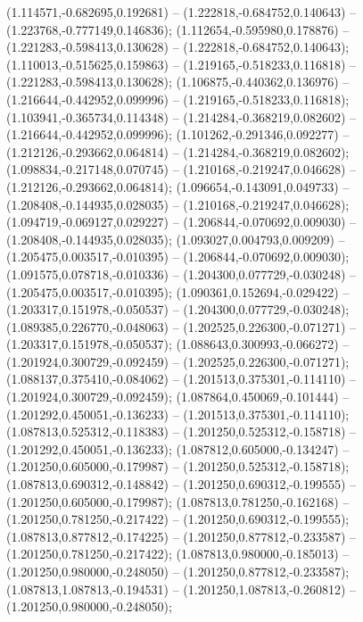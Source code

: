  (1.114571,-0.682695,0.192681) -- (1.222818,-0.684752,0.140643) -- (1.223768,-0.777149,0.146836);
 (1.112654,-0.595980,0.178876) -- (1.221283,-0.598413,0.130628) -- (1.222818,-0.684752,0.140643);
 (1.110013,-0.515625,0.159863) -- (1.219165,-0.518233,0.116818) -- (1.221283,-0.598413,0.130628);
 (1.106875,-0.440362,0.136976) -- (1.216644,-0.442952,0.099996) -- (1.219165,-0.518233,0.116818);
 (1.103941,-0.365734,0.114348) -- (1.214284,-0.368219,0.082602) -- (1.216644,-0.442952,0.099996);
 (1.101262,-0.291346,0.092277) -- (1.212126,-0.293662,0.064814) -- (1.214284,-0.368219,0.082602);
 (1.098834,-0.217148,0.070745) -- (1.210168,-0.219247,0.046628) -- (1.212126,-0.293662,0.064814);
 (1.096654,-0.143091,0.049733) -- (1.208408,-0.144935,0.028035) -- (1.210168,-0.219247,0.046628);
 (1.094719,-0.069127,0.029227) -- (1.206844,-0.070692,0.009030) -- (1.208408,-0.144935,0.028035);
 (1.093027,0.004793,0.009209) -- (1.205475,0.003517,-0.010395) -- (1.206844,-0.070692,0.009030);
 (1.091575,0.078718,-0.010336) -- (1.204300,0.077729,-0.030248) -- (1.205475,0.003517,-0.010395);
 (1.090361,0.152694,-0.029422) -- (1.203317,0.151978,-0.050537) -- (1.204300,0.077729,-0.030248);
 (1.089385,0.226770,-0.048063) -- (1.202525,0.226300,-0.071271) -- (1.203317,0.151978,-0.050537);
 (1.088643,0.300993,-0.066272) -- (1.201924,0.300729,-0.092459) -- (1.202525,0.226300,-0.071271);
 (1.088137,0.375410,-0.084062) -- (1.201513,0.375301,-0.114110) -- (1.201924,0.300729,-0.092459);
 (1.087864,0.450069,-0.101444) -- (1.201292,0.450051,-0.136233) -- (1.201513,0.375301,-0.114110);
 (1.087813,0.525312,-0.118383) -- (1.201250,0.525312,-0.158718) -- (1.201292,0.450051,-0.136233);
 (1.087812,0.605000,-0.134247) -- (1.201250,0.605000,-0.179987) -- (1.201250,0.525312,-0.158718);
 (1.087813,0.690312,-0.148842) -- (1.201250,0.690312,-0.199555) -- (1.201250,0.605000,-0.179987);
 (1.087813,0.781250,-0.162168) -- (1.201250,0.781250,-0.217422) -- (1.201250,0.690312,-0.199555);
 (1.087813,0.877812,-0.174225) -- (1.201250,0.877812,-0.233587) -- (1.201250,0.781250,-0.217422);
 (1.087813,0.980000,-0.185013) -- (1.201250,0.980000,-0.248050) -- (1.201250,0.877812,-0.233587);
 (1.087813,1.087813,-0.194531) -- (1.201250,1.087813,-0.260812) -- (1.201250,0.980000,-0.248050);
